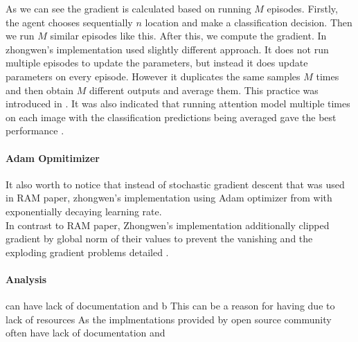 As we can see the gradient is calculated based on running $M$ episodes.
Firstly, the agent chooses sequentially $n$ location and make a classification
decision. Then we run $M$ similar episodes like this. After this,
we compute the gradient. In zhongwen's implementation used slightly different
approach. It does not run multiple episodes to update the parameters, but instead
it does update parameters on every episode. However it duplicates the same
samples $M$ times and then obtain $M$ different outputs and average them.
This practice was introduced in \cite{DBLP:journals/corr/BaMK14}.
It was also indicated that running attention model multiple times on each
image with the classification predictions being averaged gave the best
performance \cite{DBLP:journals/corr/BaMK14}.


\paragraph{Adam Opmitimizer} It also worth to notice that instead of stochastic
gradient descent that was used in RAM paper, zhongwen's implementation using Adam optimizer
from \cite{DBLP:journals/corr/KingmaB14} with exponentially decaying learning rate.
\\

In contrast to RAM paper, Zhongwen's implementation additionally clipped gradient
by global norm of their values to prevent the vanishing and the exploding
gradient problems detailed \cite{Pascanu2012}.











\paragraph{Analysis}





can have lack of documentation and b
This can be a reason for having
due to lack of resources
As the implmentations provided by open source community
often have lack of documentation and

